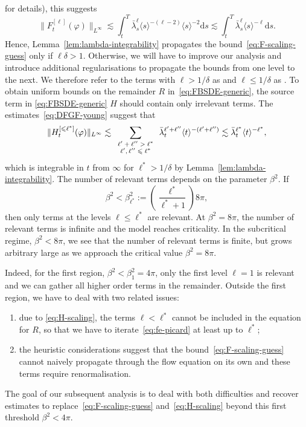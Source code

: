 \documentclass[11pt, a4paper]{scrartcl}
\numberwithin{equation}{section}
\theoremstyle{plain}
\theoremstyle{remark}
\newcommand{\assign}{:=}
\newcommand{\mathd}{\mathrm{d}}
\newcommand{\tmscript}[1]{\text{\scriptsize{$#1$}}}
\newcommand{\tmtextit}[1]{\text{{\itshape{#1}}}}
\newenvironment{enumeratealpha}{\begin{enumerate}[a{\textup{)}}] }{\end{enumerate}}
\begin{document}
for details), this suggests
\[ \| F^{[\ell]}_t (\varphi) \|_{L^{\infty}} \lesssim \int_t^T
	\bar{\lambda}_s^{\ell} \langle s \rangle^{- (\ell - 2)} \langle s \rangle^{- 2}
	\mathd s \lesssim \int_t^T \bar{\lambda}_s^{\ell} \langle s \rangle^{-\ell} \mathd
	s . \]
Hence, Lemma~\ref{lem:lambda-integrability} propagates the
bound~\eqref{eq:F-scaling-guess} only if $\ell \delta > 1$. Otherwise, we will
have to improve our analysis and introduce additional regularisations to
propagate the bounds from one level to the next. We therefore refer to the
terms with $\ell > 1 / \delta$ as \tmtextit{irrelevant} and $\ell \leqslant 1
	/ \delta$ as \tmtextit{relevant}. To obtain uniform bounds on the remainder
$R$ in~\eqref{eq:FBSDE-generic}, the source term in \eqref{eq:FBSDE-generic}
$H$ should contain only irrelevant terms. The estimates~\eqref{eq:DFGF-young}
suggest that
\begin{equation}
	\| H_t^{[\leqslant \ell^{\ast}]} (\varphi) \|_{L^{\infty}} \lesssim
	\sum_{\tmscript{\begin{array}{c}
				\ell' + \ell'' > \ell^{\ast} \\
				\ell', \ell'' \leqslant \ell^{\ast}
			\end{array}}} \bar{\lambda}_t^{\ell' + \ell''} \langle t \rangle^{- (\ell' +
		\ell'')} \lesssim \bar{\lambda}_t^{\ell^{\ast}} \langle t \rangle^{-\ell^{\ast}},
	\label{eq:H-scaling}
\end{equation}
which is integrable in $t$ from $\infty$ for $\ell^{\ast} > 1 / \delta$ by
Lemma~\ref{lem:lambda-integrability}. The number of relevant terms depends on
the parameter $\beta^2$. If
\begin{equation}
	\beta^2 < \beta_{\ell^{\ast}}^2 \assign \left(
	\frac{\ell^{\ast}}{\ell^{\ast} + 1} \right) 8 \pi, \label{eq:thresholds}
\end{equation}
then only terms at the levels $\ell \leqslant \ell^{\ast}$ are relevant. At
$\beta^2 = 8 \pi$, the number of relevant terms is infinite and the model
reaches criticality. In the subcritical regime, $\beta^2 < 8 \pi$, we see that
the number of relevant terms is finite, but grows arbitrary large as we
approach the critical value $\beta^2 = 8 \pi$.

Indeed, for the first region, $\beta^2 < \beta_1^2 = 4 \pi$, only the first
level $\ell = 1$ is relevant and we can gather all higher order terms in the
remainder. Outside the first region, we have to deal with two related issues:
\begin{enumeratealpha}
	\item due to \eqref{eq:H-scaling}, the terms $\ell < \ell^{\ast}$ cannot be
	included in the equation for $R$, so that we have to
	iterate~\eqref{eq:fe-picard} at least up to $\ell^{\ast}$;

	\item the heuristic considerations suggest that the
	bound~\eqref{eq:F-scaling-guess} cannot naively propagate through the flow
	equation on its own and these terms require renormalisation.
\end{enumeratealpha}
The goal of our subsequent analysis is to deal with both difficulties and
recover estimates to replace~\eqref{eq:F-scaling-guess}
and~\eqref{eq:H-scaling} beyond this first threshold $\beta^2 < 4 \pi$.
\end{document}
